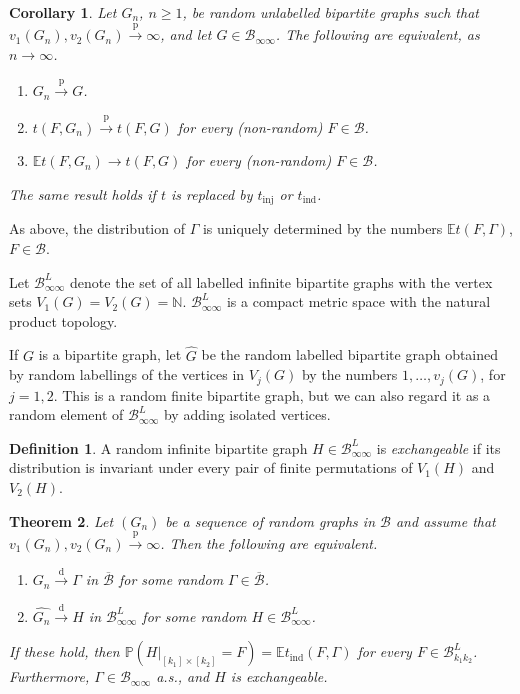 \documentclass[11pt,reqno,tbtags]{amsart}
\numberwithin{equation}{section}
\newtheorem{theorem}{Theorem}[section]
\newtheorem{corollary}[theorem]{Corollary}
\theoremstyle{definition}
\newtheorem*{definition}{Definition}
\theoremstyle{remark}
\newenvironment{romenumerate}{\begin{enumerate}%
 \renewcommand{\labelenumi}{\textup{(\roman{enumi})}}%
 \renewcommand{\theenumi}{\textup{(\roman{enumi})}}%
 }{\end{enumerate}}
\newcommand\xpar[1]{(#1)}
\newcommand\ntoo{\ensuremath{{n\to\infty}}}
\newcommand{\tend}{\longrightarrow}
\newcommand\dto{\overset{\mathrm{d}}{\tend}}
\newcommand\pto{\overset{\mathrm{p}}{\tend}}
\newcommand\bbN{\mathbb N}
\newcommand\E{\operatorname{\mathbb E{}}}
\renewcommand\P{\operatorname{\mathbb P{}}}
\newcommand\gG{\Gamma}
\newcommand\cB{\mathcal B}
\renewcommand{\=}{:=}
\newcommand{\tinj}{t_{\mathrm{inj}}}
\newcommand{\tind}{t_{\mathrm{ind}}}
\newcommand\hG{\widehat G}
\newcommand\hgn{\widehat {G_n}}
\newcommand{\restkk}{|_{[k_1]\times[k_2]}}
\newcommand{\exch}{exchangeable}
\newcommand{\BUxx}[2]{\cB_{#1#2}}
\newcommand{\BLxx}[2]{\cB^L_{#1#2}}
\newcommand{\BLkk}{\BLxx{k_1}{k_2}}
\newcommand{\cbq}{\overline{\cB}}
\newcommand{\cboo}{\BUxx{\infty}{\infty}}
\newcommand{\cbloo}{\BLxx{\infty}{\infty}}
\begin{document}
\begin{corollary}
  \label{C2B}
Let $G_n$, $n\ge1$, be random unlabelled bipartite graphs such that
$v_1(G_n),v_2(G_n)\pto\infty$, and let $G\in\cboo$.
The following are equivalent, as \ntoo.
\begin{romenumerate}
  \item\label{C2Ba}
$G_n\pto G$.
  \item\label{C2Bc}
$t(F,G_n)\pto t(F,G)$ for every (non-random) $F\in\cB$.
  \item\label{C2Bd}
$\E t(F,G_n)\to t(F,G)$ for every (non-random) $F\in\cB$.
\end{romenumerate}

The same result holds if $t$ is replaced by $\tinj$ or $\tind$.
\end{corollary}

As above, the distribution of $\gG$ is uniquely
determined by the numbers $\E t(F,\gG)$, $F\in\cB$.



Let $\cbloo$ denote the set of all 
labelled {infinite} bipartite graphs
with the vertex sets $V_1(G)=V_2(G)=\bbN$.
$\cbloo$ is a compact metric space with the natural product topology.


If $G$ is a bipartite graph, let $\hG$ be the random labelled
bipartite graph 
obtained by random labellings of the vertices in $V_j(G)$ by the numbers
$1,\dots,v_j(G)$, for $j=1,2$.
This is a random finite bipartite graph, but
we  can also regard it as a random
element of $\cbloo$ by adding isolated vertices.

\begin{definition}
  A random infinite bipartite graph $H\in\cbloo$ is \emph{\exch} if its
  distribution is invariant under every pair of finite permutations of
  $V_1(H)$ and $V_2(H)$.
\end{definition}


\begin{theorem}\label{TC1B}
  Let $(G_n)$ be a sequence of random graphs in $\cB$ and assume that
  $v_1(G_n),v_2(G_n)\pto\infty$. Then the following are equivalent.
  \begin{romenumerate}
\item
$G_n\dto \gG$ in $\cbq$ for some random $\gG\in\cbq$.	
\item
$\hgn\dto H$ in $\cbloo$ for some random $H\in\cbloo$.	
  \end{romenumerate}
If these hold, then
$\P\xpar{H\restkk =F} = \E \tind(F,\gG)$ for every $F\in\BLkk$.
Furthermore, $\gG\in\cboo$ a.s., and
$H$ is \exch.
\end{theorem}
\end{document}
